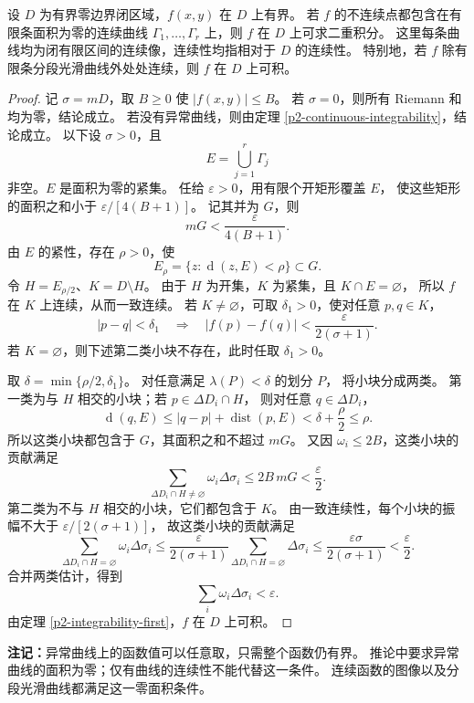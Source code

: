 \begin{corollary}[除有限条零面积曲线外连续的函数可积]\label{p2-curve-discontinuity-integrability}
设 $D$ 为有界零边界闭区域，$f(x,y)$ 在 $D$ 上有界。
若 $f$ 的不连续点都包含在有限条面积为零的连续曲线
$\Gamma_1,\ldots,\Gamma_r$ 上，则 $f$ 在 $D$ 上可求二重积分。
这里每条曲线均为闭有限区间的连续像，连续性均指相对于 $D$ 的连续性。
特别地，若 $f$ 除有限条分段光滑曲线外处处连续，则 $f$ 在 $D$ 上可积。
\end{corollary}
\begin{proof}
记 $\sigma=mD$，取 $B\ge0$ 使 $|f(x,y)|\le B$。
若 $\sigma=0$，则所有 Riemann 和均为零，结论成立。
若没有异常曲线，则由定理 \ref{p2-continuous-integrability}，结论成立。
以下设 $\sigma>0$，且
\[
E=\bigcup_{j=1}^r\Gamma_j
\]
非空。$E$ 是面积为零的紧集。
任给 $\varepsilon>0$，用有限个开矩形覆盖 $E$，
使这些矩形的面积之和小于 $\varepsilon/[4(B+1)]$。
记其并为 $G$，则
\[
mG<\frac{\varepsilon}{4(B+1)}.
\]
由 $E$ 的紧性，存在 $\rho>0$，使
\[
E_\rho=\{z:\operatorname{d}(z,E)<\rho\}\subset G.
\]
令 $H=E_{\rho/2}$、$K=D\setminus H$。
由于 $H$ 为开集，$K$ 为紧集，且 $K\cap E=\varnothing$，
所以 $f$ 在 $K$ 上连续，从而一致连续。
若 $K\ne\varnothing$，可取 $\delta_1>0$，使对任意 $p,q\in K$，
\[
|p-q|<\delta_1
\quad\Longrightarrow\quad
|f(p)-f(q)|<\frac{\varepsilon}{2(\sigma+1)}.
\]
若 $K=\varnothing$，则下述第二类小块不存在，此时任取 $\delta_1>0$。

取 $\delta=\min\{\rho/2,\delta_1\}$。
对任意满足 $\lambda(P)<\delta$ 的划分 $P$，
将小块分成两类。
第一类为与 $H$ 相交的小块；若 $p\in\Delta D_i\cap H$，
则对任意 $q\in\Delta D_i$，
\[
\operatorname{d}(q,E)
\le |q-p|+\operatorname{dist}(p,E)
<\delta+\frac{\rho}{2}\le\rho.
\]
所以这类小块都包含于 $G$，其面积之和不超过 $mG$。
又因 $\omega_i\le2B$，这类小块的贡献满足
\[
\sum_{\Delta D_i\cap H\ne\varnothing}\omega_i\Delta\sigma_i
\le2B\,mG<\frac{\varepsilon}{2}.
\]
第二类为不与 $H$ 相交的小块，它们都包含于 $K$。
由一致连续性，每个小块的振幅不大于 $\varepsilon/[2(\sigma+1)]$，
故这类小块的贡献满足
\[
\sum_{\Delta D_i\cap H=\varnothing}\omega_i\Delta\sigma_i
\le\frac{\varepsilon}{2(\sigma+1)}
\sum_{\Delta D_i\cap H=\varnothing}\Delta\sigma_i
\le\frac{\varepsilon\sigma}{2(\sigma+1)}
<\frac{\varepsilon}{2}.
 \]
合并两类估计，得到
\[
\sum_i\omega_i\Delta\sigma_i<\varepsilon.
\]
由定理 \ref{p2-integrability-first}，$f$ 在 $D$ 上可积。
\end{proof}

\textbf{注记：}异常曲线上的函数值可以任意取，只需整个函数仍有界。
推论中要求异常曲线的面积为零；仅有曲线的连续性不能代替这一条件。
连续函数的图像以及分段光滑曲线都满足这一零面积条件。

